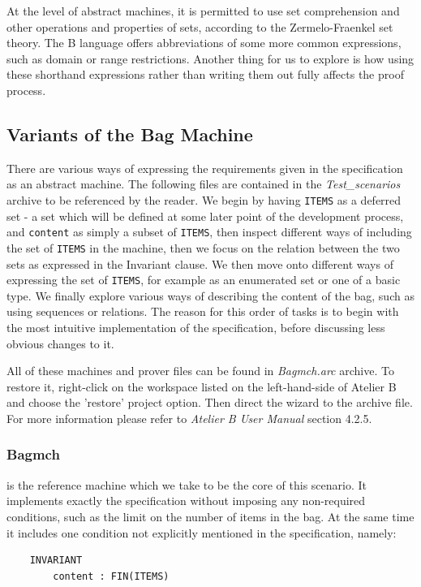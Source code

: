 \documentclass[12pt,journal,duplex]{IEEEtran}
\begin{document}
	At the level of abstract machines, it is permitted to use set comprehension and other operations and properties of sets, according to the Zermelo-Fraenkel set theory. The B language offers abbreviations of some more common expressions, such as domain or range restrictions. Another thing for us to explore is how using these shorthand expressions rather than writing them out fully affects the proof process.

	\subsection{Variants of the Bag Machine}
	There are various ways of expressing the requirements given in the specification as an abstract machine. The following files are contained in the \emph{Test\_scenarios} archive to be referenced by the reader. We begin by having \texttt{ITEMS} as a deferred set - a set which will be defined at some later point of the development process, and \texttt{content} as simply a subset of \texttt{ITEMS}, then inspect different ways of including the set of \texttt{ITEMS} in the machine, then we focus on the relation between the two sets as expressed in the Invariant clause. We then move onto different ways of expressing the set of \texttt{ITEMS}, for example as an enumerated set or one of a basic type. We finally explore various ways of describing the content of the bag, such as using sequences or relations. The reason for this order of tasks is to begin with the most intuitive implementation of the specification, before discussing less obvious changes to it.


	All of these machines and prover files can be found in \emph{Bagmch.arc} archive. To restore it, right-click on the workspace listed on the left-hand-side of Atelier B and choose the 'restore' project option. Then direct the wizard to the archive file. For more information please refer to \emph{Atelier B User Manual} section 4.2.5.

	\subsubsection{Bagmch} is the reference machine which we take to be the core of this scenario. It implements exactly the specification without imposing any non-required conditions, such as the limit on the number of items in the bag. At the same time it includes one condition not explicitly mentioned in the specification, namely:
	\begin{lstlisting}
	INVARIANT
		content : FIN(ITEMS)
	\end{lstlisting}
\end{document}
